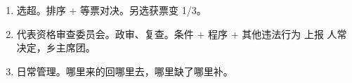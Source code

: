 \begin{enumerate}
\begin{enumerate}
\begin{enumerate}
                  \item 直接选举。县乡直选。选委会主持，人常领导任命。
                        \begin{enumerate}
                          \item 选区划分。123 随便不区划。
                          \item 选民登记。一次登记，长期有效，只做微调。
                                名单 20 公布，5 日申诉，3 日处理，投票前 5 日起诉，申诉前置，一审终审，投票前判决。
                          \item 推荐候选人。单位可单可联合，个人必须 10 个人，谁能投票找谁推，间接选举酝酿 2 日。
                          \item 候选人应当提前一天介绍。
                          \item 公布候选人名单。15 非正式，7 正式。
                          \item 直选双过半。过半人去，再获得过半人票。
                          \item 代写。是人即可。
                          \item 代投。书面 + 代理人要有选民资格（最多接 3 人，最多投 4 票）+ 选委会同意。
                          \item 罢免。全过半。
                          \item 选区、选民、选委会只有直选有。
                        \end{enumerate}
                  \item 间接选举。
                        \begin{enumerate}
                          \item 省自直、设区的市、自治州 \yjt 下一级人大选举产生。
                          \item 间选单过半。
                          \item 上级人常主持、具体工作下级人大主席团。
                        \end{enumerate}
                  \item 差额选举。特区的选举全人常主持。选举会议成员 10+ 提名，联名提名不能超过应选人数。
                \end{enumerate}
          \item 选超。排序 + 等票对决。另选获票变 1/3。
          \item 代表资格审查委员会。政审、复查。条件 + 程序 + 其他违法行为 \yjt 上报 \yjt 人常决定，乡主席团。
          \item 日常管理。哪里来的回哪里去，哪里缺了哪里补。

\end{enumerate}
\end{enumerate}
